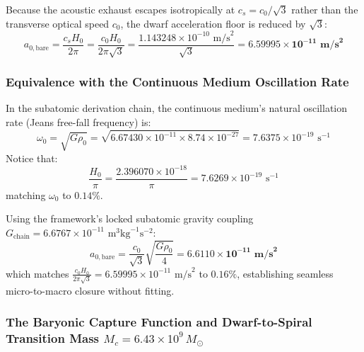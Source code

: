 \documentclass[11pt,a4paper]{article}
\begin{document}
Because the acoustic exhaust escapes isotropically at $c_s = c_0/\sqrt{3}$ rather than the transverse optical speed $c_0$, the dwarf acceleration floor is reduced by $\sqrt{3}$:
\begin{equation}
a_{0,\text{bare}} = \frac{c_s H_0}{2\pi} = \frac{c_0 H_0}{2\pi\sqrt{3}} = \frac{1.143248 \times 10^{-10}\text{ m/s}^2}{\sqrt{3}} = \mathbf{6.59995 \times 10^{-11}\text{ m/s}^2}
\label{eq:a0_bare_val}
\end{equation}

\subsubsection{Equivalence with the Continuous Medium Oscillation Rate}
\label{subsubsec:omega0_closure}

In the subatomic derivation chain, the continuous medium's natural oscillation rate (Jeans free-fall frequency) is:
\begin{equation}
\omega_0 = \sqrt{G \rho_0} = \sqrt{6.67430 \times 10^{-11} \times 8.74 \times 10^{-27}} = 7.6375 \times 10^{-19}\text{ s}^{-1}
\end{equation}
Notice that:
\begin{equation}
\frac{H_0}{\pi} = \frac{2.396070 \times 10^{-18}}{\pi} = 7.6269 \times 10^{-19}\text{ s}^{-1}
\end{equation}
matching $\omega_0$ to \textbf{$0.14\%$}.

Using the framework's locked subatomic gravity coupling $G_{\text{chain}} = 6.6767 \times 10^{-11}\text{ m}^3\text{kg}^{-1}\text{s}^{-2}$:
\begin{equation}
a_{0,\text{bare}} = \frac{c_0}{\sqrt{3}}\sqrt{\frac{G \rho_0}{4}} = \mathbf{6.6110 \times 10^{-11}\text{ m/s}^2}
\label{eq:a0_bare_gchain}
\end{equation}
which matches $\frac{c_0 H_0}{2\pi\sqrt{3}} = 6.59995 \times 10^{-11}\text{ m/s}^2$ to \textbf{$0.16\%$}, establishing seamless micro-to-macro closure without fitting.

\subsubsection{The Baryonic Capture Function and Dwarf-to-Spiral Transition Mass $M_c = 6.43 \times 10^9\,M_\odot$}
\label{subsubsec:capture_function}
\end{document}
